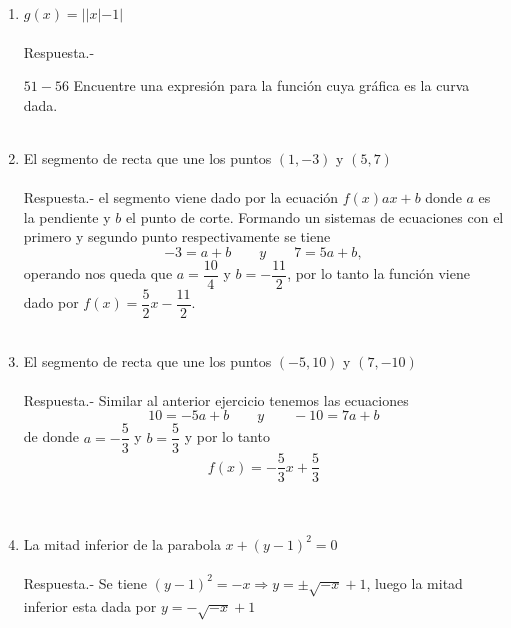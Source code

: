 \begin{enumerate}
    \item $g(x)=||x|-1|$\\\\
	Respuesta.-\; 

	\begin{center}
	\end{center}
	\vspace{.5cm}

    $51-56$ Encuentre una expresión para la función cuya gráfica es la curva dada.\\\\

    \item El segmento de recta que une los puntos $(1,-3)$ y $(5,7)$\\\\
	Respuesta.-\; el segmento viene dado por la ecuación $f(x)ax+b$ donde $a$ es la pendiente y $b$ el punto de corte. Formando un sistemas de ecuaciones con el primero y segundo punto respectivamente se tiene $$ -3 = a + b \qquad y \qquad 7= 5a + b,$$ operando nos queda que  $a=\dfrac{10}{4}$ y $b=- \dfrac{11}{2}$, por lo tanto la función viene dado por $f(x)=\dfrac{5}{2}x - \dfrac{11}{2}$.\\\\

    \item El segmento de recta que une los puntos $(-5,10)$ y $(7,-10)$\\\\
	Respuesta.-\; Similar al anterior ejercicio tenemos las ecuaciones $$10=-5a+b \qquad y \qquad -10=7a+b$$ de donde $a=-\dfrac{5}{3}$ y $b=\dfrac{5}{3}$ y por lo tanto $$f(x)=-\dfrac{5}{3}x + \dfrac{5}{3}$$\\\\

    \item La mitad inferior de la parabola $x+(y-1)^2 = 0$\\\\
	Respuesta.-\; Se tiene $(y-1)^2 = -x \Longrightarrow y=\pm \sqrt{-x} + 1$, luego la mitad inferior esta dada por $y=- \sqrt{-x} +1$\\\\


\end{enumerate}
